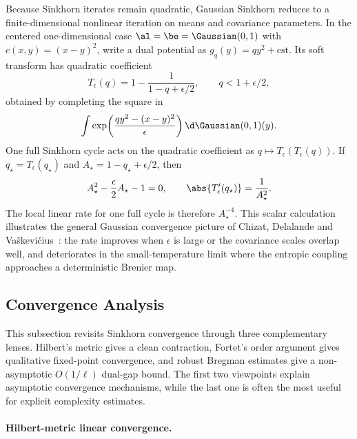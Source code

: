 \begin{rem}\label{rem-gaussian-rates}
	Because Sinkhorn iterates remain quadratic, Gaussian Sinkhorn reduces to a finite-dimensional nonlinear iteration on means and covariance parameters. In the centered one-dimensional case $\al=\be=\Gaussian(0,1)$ with $c(x,y)=(x-y)^2$, write a dual potential as $g_q(y)=q y^2+\mathrm{cst}$. Its soft transform has quadratic coefficient
	\[
		T_\epsilon(q)
		=
		1-\frac{1}{1-q+\epsilon/2},
		\qquad q<1+\epsilon/2,
	\]
	obtained by completing the square in
	\[
		\int
		\exp\!\left(\frac{q y^2-(x-y)^2}{\epsilon}\right)
		\d\Gaussian(0,1)(y).
	\]
	One full Sinkhorn cycle acts on the quadratic coefficient as $q\mapsto T_\epsilon(T_\epsilon(q))$. If $q_\star=T_\epsilon(q_\star)$ and $A_\star=1-q_\star+\epsilon/2$, then
	\[
		A_\star^2-\frac{\epsilon}{2}A_\star-1=0,
		\qquad
		\abs{T_\epsilon'(q_\star)}=\frac{1}{A_\star^2}.
	\]
	The local linear rate for one full cycle is therefore $A_\star^{-4}$. This scalar calculation illustrates the general Gaussian convergence picture of Chizat, Delalande and Va\v{s}kevi\v{c}ius~\cite{chizat2024sharper}: the rate improves when $\epsilon$ is large or the covariance scales overlap well, and deteriorates in the small-temperature limit where the entropic coupling approaches a deterministic Brenier map.
\end{rem}


\subsection{Convergence Analysis}
\label{sec-convergence-dual}

This subsection revisits Sinkhorn convergence through three complementary lenses. Hilbert's metric gives a clean contraction, Fortet's order argument gives qualitative fixed-point convergence, and robust Bregman estimates give a non-asymptotic $O(1/\ell)$ dual-gap bound. The first two viewpoints explain asymptotic convergence mechanisms, while the last one is often the most useful for explicit complexity estimates.

\paragraph{Hilbert-metric linear convergence.}

